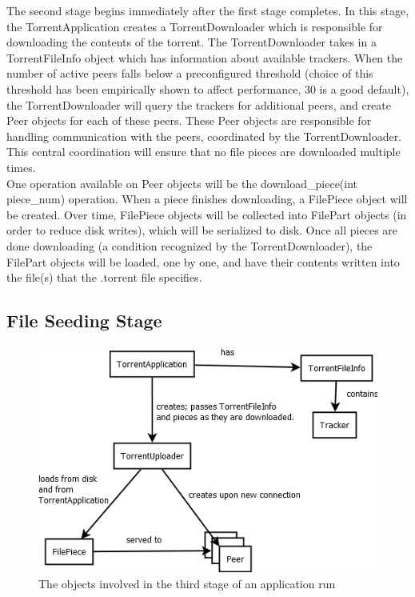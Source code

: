 \documentclass[letter]{scrartcl}
\begin{document}
The second stage begins immediately after the first stage completes.   In this stage, the TorrentApplication creates a TorrentDownloader which is responsible for downloading the contents of the torrent.  The TorrentDownloader takes in a TorrentFileInfo object which has information about available trackers.  When the number of active peers falls below a preconfigured threshold (choice of this threshold has been empirically shown to affect performance, 30 is a good default), the TorrentDownloader will query the trackers for additional peers, and create Peer objects for each of these peers.  These Peer objects are responsible for handling communication with the peers, coordinated by the TorrentDownloader.  This central coordination will ensure that no file pieces are downloaded multiple times.\\

One operation available on Peer objects will be the download\_piece(int piece\_num) operation.  When a piece finishes downloading, a FilePiece object will be created.  Over time, FilePiece objects will be collected into FilePart objects (in order to reduce disk writes), which will be serialized to disk.  Once all pieces are done downloading (a condition recognized by the TorrentDownloader), the FilePart objects will be loaded, one by one, and have their contents written into the file(s) that the .torrent file specifies.

\subsection{File Seeding Stage}
\begin{figure}[h]
\centering
\includegraphics[scale=.5]{stepThree.png}
\caption{The objects involved in the third stage of an application run}
\end{figure}
\end{document}
